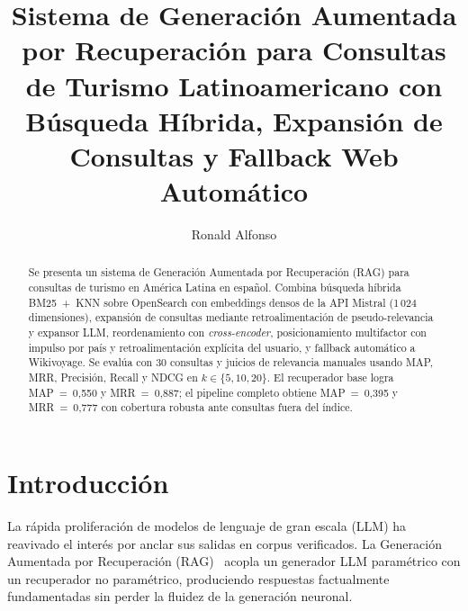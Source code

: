 \documentclass[runningheads]{llncs}
\begin{document}
\title{Sistema de Generaci\'on Aumentada por Recuperaci\'on para
Consultas de Turismo Latinoamericano con B\'usqueda H\'ibrida,
Expansi\'on de Consultas y Fallback Web Autom\'atico}


\author{Ronald Alfonso}

\maketitle

\begin{abstract}
Se presenta un sistema de Generaci\'on Aumentada por Recuperaci\'on
(RAG) para consultas de turismo en Am\'erica Latina en espa\~nol.
Combina b\'usqueda h\'ibrida BM25~+~KNN sobre OpenSearch con embeddings
densos de la API Mistral (1\,024 dimensiones), expansi\'on de consultas
mediante retroalimentaci\'on de pseudo-relevancia y expansor LLM,
reordenamiento con \textit{cross-encoder}, posicionamiento multifactor
con impulso por pa\'is y retroalimentaci\'on expl\'icita del usuario,
y fallback autom\'atico a Wikivoyage. Se eval\'ua con 30 consultas y
juicios de relevancia manuales usando MAP, MRR, Precisi\'on, Recall y
NDCG en $k\in\{5,10,20\}$. El recuperador base logra MAP~=~0{,}550 y
MRR~=~0{,}887; el pipeline completo obtiene MAP~=~0{,}395 y
MRR~=~0{,}777 con cobertura robusta ante consultas fuera del \'indice.
\end{abstract}

\section{Introducci\'on}

La r\'apida proliferaci\'on de modelos de lenguaje de gran escala (LLM)
ha reavivado el inter\'es por anclar sus salidas en corpus verificados.
La Generaci\'on Aumentada por Recuperaci\'on (RAG)~\cite{lewis2020rag}
acopla un generador LLM param\'etrico con un recuperador no param\'etrico,
produciendo respuestas factualmente fundamentadas sin perder la fluidez
de la generaci\'on neuronal.
\end{document}
